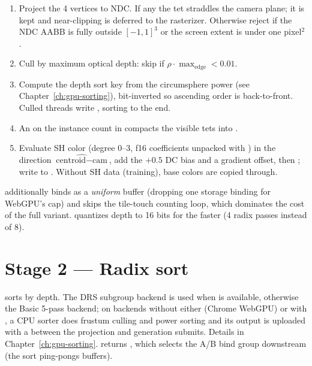 \begin{enumerate}
\item Project the 4 vertices to NDC. If any  the tet
  straddles the camera plane; it is kept and near-clipping is deferred to the
  rasterizer. Otherwise reject if the NDC AABB is fully outside
  $[-1,1]^3$ or the screen extent is under one pixel${}^2$.
\item Cull by maximum optical depth: skip if
  $\rho \cdot \max_{\text{edge}} < 0.01$.
\item Compute the depth sort key from the circumsphere power
  (see Chapter~\ref{ch:gpu-sorting}), bit-inverted so ascending order is
  back-to-front. Culled threads write , sorting to the end.
\item An  on the instance count in 
  compacts the visible tets into .
\item Evaluate SH color (degree 0--3, f16 coefficients unpacked with
  ) in the direction
  $\widehat{\text{centroid} - \text{cam}}$, add the $+0.5$ DC bias and a
  gradient offset, then ; write to .
  Without SH data (training), base colors are copied through.
\end{enumerate}

 additionally binds  as a
\emph{uniform} buffer (dropping one storage binding for WebGPU's cap) and
skips the tile-touch counting loop, which dominates the cost of the full
variant.  quantizes depth to 16 bits for the
faster  (4 radix passes instead of 8).

\section{Stage 2 --- Radix sort}

 sorts  by depth. The DRS
subgroup backend is used when  is available,
otherwise the Basic 5-pass backend; on backends without either (Chrome
WebGPU) or with , a CPU sorter does frustum culling and
power sorting and its output is uploaded with a  between
the projection and generation submits. Details in Chapter~\ref{ch:gpu-sorting}.
 returns , which selects the A/B
bind group downstream (the sort ping-pongs buffers).


